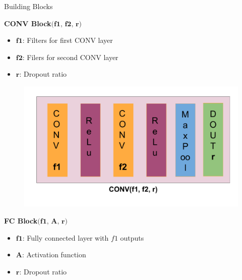 \documentclass[20pt]{beamer}
\newlength{\onecolwid}
\begin{document}
\begin{frame}[t]
\begin{columns}[t]
\begin{column}{\onecolwid}
\begin{block}{Building Blocks}
	
\begin{minipage}{0.5\onecolwid}
\begin{center}
\textbf{CONV Block$\textbf{(f1, f2, r)}$}
\vspace*{0in}
\begin{itemize}
\item \textbf{$\textbf{f1}$}: Filters for first CONV layer
\item \textbf{$\textbf{f2}$}: Filers for second CONV layer
\item \textbf{$\textbf{r}$}: Dropout ratio 
\end{itemize}
\end{center}
	\begin{figure}
	\centering
	\includegraphics[scale=0.6]{Images/ConvB.pdf}
	\end{figure}
\end{minipage}
\hfill
\begin{minipage}{0.45\onecolwid}
\begin{center}
\textbf{FC Block$\textbf{(f1, A, r)}$}
\vspace*{0in}
\begin{itemize}
\item $\textbf{f1}$: Fully connected layer with $f1$ outputs
\item \textbf{$\textbf{A}$}: Activation function
\item \textbf{$\textbf{r}$}: Dropout ratio 
\end{itemize}
\end{center}


\end{minipage}
\end{block}
\end{column}
\end{columns}
\end{frame}
\end{document}
